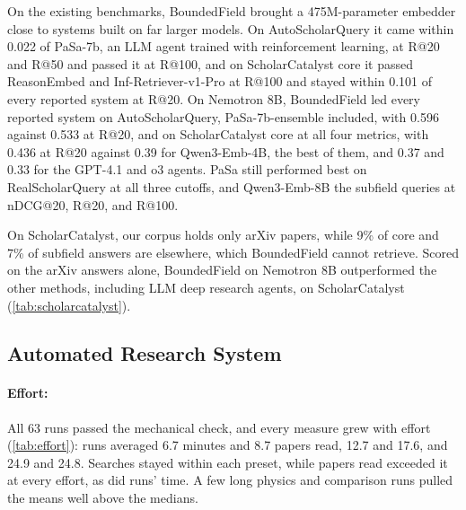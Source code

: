 On the existing benchmarks, BoundedField brought a 475M-parameter embedder close to systems built on far larger models. On AutoScholarQuery it came within 0.022 of PaSa-7b, an LLM agent trained with reinforcement learning, at R@20 and R@50 and passed it at R@100, and on ScholarCatalyst core it passed ReasonEmbed and Inf-Retriever-v1-Pro at R@100 and stayed within 0.101 of every reported system at R@20. On Nemotron 8B, BoundedField led every reported system on AutoScholarQuery, PaSa-7b-ensemble included, with 0.596 against 0.533 at R@20, and on ScholarCatalyst core at all four metrics, with 0.436 at R@20 against 0.39 for Qwen3-Emb-4B, the best of them, and 0.37 and 0.33 for the GPT-4.1 and o3 agents. PaSa still performed best on RealScholarQuery at all three cutoffs, and Qwen3-Emb-8B the subfield queries at nDCG@20, R@20, and R@100.

On ScholarCatalyst, our corpus holds only arXiv papers, while 9\% of core and 7\% of subfield answers are elsewhere, which BoundedField cannot retrieve. Scored on the arXiv answers alone, BoundedField on Nemotron 8B outperformed the other methods, including LLM deep research agents, on ScholarCatalyst (\cref{tab:scholarcatalyst}). 

\subsection{Automated Research System}

\paragraph{Effort:}
All 63 runs passed the mechanical check, and every measure grew with effort (\cref{tab:effort}):  runs averaged 6.7 minutes and 8.7 papers read,  12.7 and 17.6, and  24.9 and 24.8. Searches stayed within each preset, while papers read exceeded it at every effort, as did  runs' time. A few long physics and comparison runs pulled the means well above the medians.
